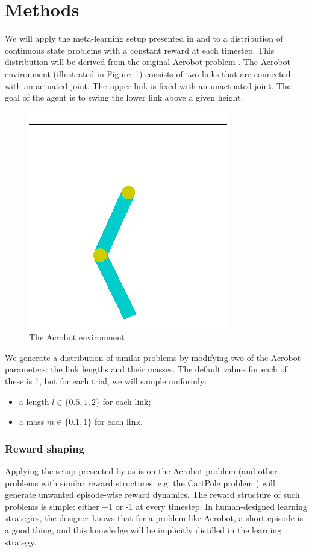 \documentclass[letterpaper]{article}
\begin{document}
\section{Methods}
We will apply the meta-learning setup presented in \cite{learningtorl} and
\cite{fastrlviaslowrl} to a distribution of continuous state problems with a 
constant reward at each timestep. This distribution will be derived from
the original Acrobot problem \citep{acrobot1996, acrobot2015}. The Acrobot
environment (illustrated in Figure~\ref{fig:acrobot}) consists of two links 
that are connected with an actuated joint. The upper link is fixed with an 
unactuated joint. The goal of the agent is to swing the lower link above a 
given height.

\begin{figure}[H]
	\centering
	\includegraphics[width=.4\linewidth]{fig/acrobot.png}
	\caption{The Acrobot environment}
	\label{fig:acrobot}
\end{figure}

We generate a distribution of similar problems by modifying
two of the Acrobot parameters: the link lengths and their masses. The default
values for each of these is 1, but for each trial, we will sample uniformly:
\begin{itemize}
	\item a length $l \in \{0.5, 1, 2\}$ for each link;
	\item a mass $m \in \{0.1, 1\}$ for each link.
\end{itemize}

\subsubsection{Reward shaping}
Applying the setup presented by \cite{learningtorl} as is on the Acrobot
problem (and other problems with similar reward structures, e.g. the
CartPole problem \citep{barto-cartpole}) will generate unwanted episode-wise
reward dynamics. The reward structure of such problems is simple:
either +1 or -1 at every timestep. In human-designed learning strategies, the
designer knows that for a problem like Acrobot, a short episode is a good thing,
and this knowledge will be implicitly distilled in the learning strategy. 
\end{document}

